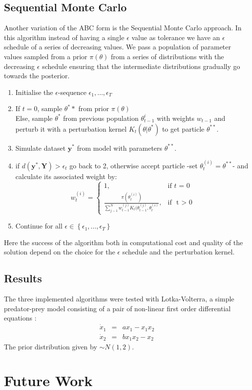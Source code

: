 \documentclass[12pt,a4paper,titlepage]{article}
\begin{document}
\subsection{Sequential Monte Carlo}
Another variation of the ABC form is the Sequential Monte Carlo approach\cite{toni2009abc}. In this algorithm instead of having a single $\epsilon$ value as tolerance we have an $\epsilon$ schedule of a series of decreasing values. We pass a population of parameter values sampled from a prior $\pi(\theta)$  from a series of distributions with the decreasing $\epsilon$ schedule ensuring that the intermediate distributions gradually go towards the posterior.
\begin{enumerate}[noitemsep]
\item{Initialise the $\epsilon$-sequence $\epsilon_{1}, \dots, \epsilon_{T}$}
\item{If $t=0$, sample $\theta^**$ from prior $\pi(\theta)$\\
Else, sample $\theta^*$ from previous population $\theta_{t-1}^{i}$ with weights $w_{t-1}$ and perturb it with a perturbation kernel $K_{t}(\theta|\theta^*) $ to get particle $\theta^{**}$.}
\item{Simulate dataset $\mathbf{y}^*$ from model with parameters $\theta^{**}$.}
\item{if $d(\mathbf{y}^*, \mathbf{Y}) > \epsilon_{t}$ go back to 2, otherwise accept particle -set $\theta_{t}^{(i)} = \theta^{**}$- and calculate its associated weight by:
\begin{equation*}
w_{t}^{(i)} = \begin{cases} 1, & \mbox{if } t\mbox{ = 0} \\ \frac{\pi(\theta_{t}^{(i)})}{\sum_{j-1}^N w_{t-1}^{(j)}K_{t}(\theta_{t-1}^{(j)}, \theta_{t}^{(i)}} , & \mbox{if } \mbox{ t > 0} \end{cases}
\end{equation*} }
\item{Continue for all $\epsilon \in \left\{{\epsilon_{1}, \dots, \epsilon_{T}}\right\}$}
\end{enumerate}
Here the success of the algorithm both in computational cost and quality of the solution depend on the choice for the $\epsilon$ schedule and the perturbation kernel.
\subsection{Results}
The three implemented algorithms were tested with Lotka-Volterra\cite{lotka1925elements}, a simple predator-prey model consisting of a pair of non-linear first order differential equations :
\begin{eqnarray*}
\dot x_{1} & = & ax_{1} - x_{1} x_{2}\\
\dot x_{2} & =& b x_{1}x_{2} - x_{2}
\end{eqnarray*}
The prior distribution given by $\sim N(1,2)$.
\section{Future Work}


\end{document}
